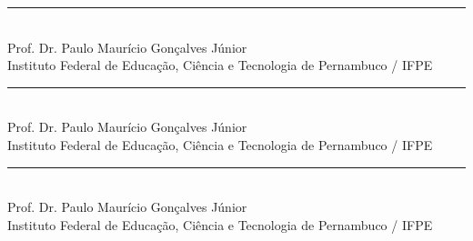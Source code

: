 \begin{center}
        \vspace{0.2cm}
        {\SingleSpacing
		\par\noindent\rule{0.6\textwidth}{0.4pt}\\
		Prof. Dr. Paulo Maurício Gonçalves Júnior\\
		Instituto Federal de Educação, Ciência e Tecnologia de Pernambuco / IFPE}
		
		\vspace{0.2cm}
        {\SingleSpacing
		\par\noindent\rule{0.6\textwidth}{0.4pt}\\
		Prof. Dr. Paulo Maurício Gonçalves Júnior\\
		Instituto Federal de Educação, Ciência e Tecnologia de Pernambuco / IFPE}
		
		\vspace{0.2cm}
        {\SingleSpacing
		\par\noindent\rule{0.6\textwidth}{0.4pt}\\
		Prof. Dr. Paulo Maurício Gonçalves Júnior\\
		Instituto Federal de Educação, Ciência e Tecnologia de Pernambuco / IFPE}
		

  \end{center}
  
  




   
   



